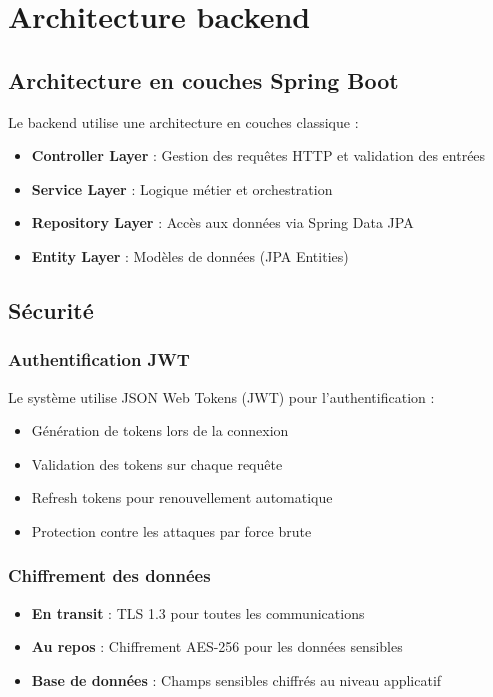 \documentclass[a4paper,11pt]{report}
\begin{document}
\section{Architecture backend}

\subsection{Architecture en couches Spring Boot}

Le backend utilise une architecture en couches classique :

\begin{itemize}
    \item \textbf{Controller Layer} : Gestion des requêtes HTTP et validation des entrées
    \item \textbf{Service Layer} : Logique métier et orchestration
    \item \textbf{Repository Layer} : Accès aux données via Spring Data JPA
    \item \textbf{Entity Layer} : Modèles de données (JPA Entities)
\end{itemize}

\subsection{Sécurité}

\subsubsection{Authentification JWT}

Le système utilise JSON Web Tokens (JWT) pour l'authentification :

\begin{itemize}
    \item Génération de tokens lors de la connexion
    \item Validation des tokens sur chaque requête
    \item Refresh tokens pour renouvellement automatique
    \item Protection contre les attaques par force brute
\end{itemize}

\subsubsection{Chiffrement des données}

\begin{itemize}
    \item \textbf{En transit} : TLS 1.3 pour toutes les communications
    \item \textbf{Au repos} : Chiffrement AES-256 pour les données sensibles
    \item \textbf{Base de données} : Champs sensibles chiffrés au niveau applicatif
\end{itemize}
\end{document}
